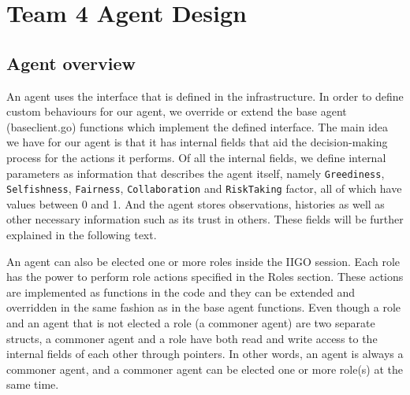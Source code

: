 

\chapter{Team 4 Agent Design}

\section{Agent overview}
An agent uses the interface that is defined in the infrastructure. In order to define custom behaviours for our agent, we override or extend the base agent (baseclient.go) functions which implement the defined interface. The main idea we have for our agent is that it has internal fields that aid the decision-making process for the actions it performs. Of all the internal fields, we define internal parameters as information that describes the agent itself, namely \texttt{Greediness}, \texttt{Selfishness}, \texttt{Fairness}, \texttt{Collaboration} and \texttt{RiskTaking} factor, all of which have values between 0 and 1. And the agent stores observations, histories as well as other necessary information such as its trust in others. These fields will be further explained in the following text.

An agent can also be elected one or more roles inside the IIGO session. Each role has the power to perform role actions specified in the Roles section. These actions are implemented as functions in the code and they can be extended and overridden in the same fashion as in the base agent functions. Even though a role and an agent that is not elected a role (a commoner agent) are two separate structs, a commoner agent and a role have both read and write access to the internal fields of each other through pointers. In other words, an agent is always a commoner agent, and a commoner agent can be elected one or more role(s) at the same time.

